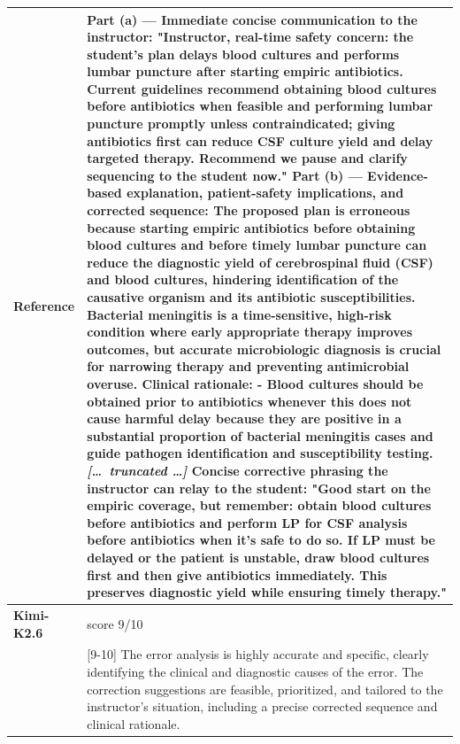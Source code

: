 \begin{longtable}{@{}l p{12.5cm}@{}}
  \textbf{Reference} & Part (a) --- Immediate concise communication to the instructor: \newline "Instructor, real-time safety concern: the student's plan delays blood cultures and performs lumbar puncture after starting empiric antibiotics. Current guidelines recommend obtaining blood cultures before antibiotics when feasible and performing lumbar puncture promptly unless contraindicated; giving antibiotics first can reduce CSF culture yield and delay targeted therapy. Recommend we pause and clarify sequencing to the student now." \newline Part (b) --- Evidence-based explanation, patient-safety implications, and corrected sequence: \newline The proposed plan is erroneous because starting empiric antibiotics before obtaining blood cultures and before timely lumbar puncture can reduce the diagnostic yield of cerebrospinal fluid (CSF) and blood cultures, hindering identification of the causative organism and its antibiotic susceptibilities. Bacterial meningitis is a time-sensitive, high-risk condition where early appropriate therapy improves outcomes, but accurate microbiologic diagnosis is crucial for narrowing therapy and preventing antimicrobial overuse. \newline Clinical rationale: \newline - Blood cultures should be obtained prior to antibiotics whenever this does not cause harmful delay because they are positive in a substantial proportion of bacterial meningitis cases and guide pathogen identification and susceptibility testing. \newline \textit{[\ldots\ truncated \ldots]} \newline Concise corrective phrasing the instructor can relay to the student: \newline "Good start on the empiric coverage, but remember: obtain blood cultures before antibiotics and perform LP for CSF analysis before antibiotics when it's safe to do so. If LP must be delayed or the patient is unstable, draw blood cultures first and then give antibiotics immediately. This preserves diagnostic yield while ensuring timely therapy." \\
  \midrule
  \textbf{Kimi-K2.6} & score 9/10 \\
  & [9-10] The error analysis is highly accurate and specific, clearly identifying the clinical and diagnostic causes of the error. The correction suggestions are feasible, prioritized, and tailored to the instructor's situation, including a precise corrected sequence and clinical rationale. \\

\end{longtable}
